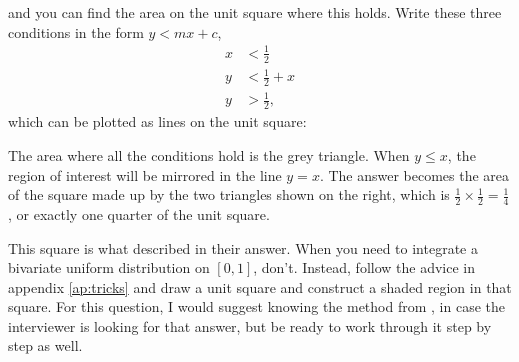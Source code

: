 \documentclass[a4paper]{article}
\begin{document}
and you can find the area on the unit square where this holds.
Write these three conditions in the form $y < mx + c$,
\begin{align}
x  &< \frac{1}{2}     \label{eq:stickbreaking:line1}  \\
y  &< \frac{1}{2} + x \label{eq:stickbreaking:line2}  \\
y  &> \frac{1}{2}     \label{eq:stickbreaking:line3}
\text{,}
\end{align}
which can be plotted as lines on the unit square:
\begin{center}
\end{center}
The area where all the conditions hold is the grey triangle.
When $y \leq x$, the region of interest will be mirrored in the line $y=x$.
The answer becomes the area of the square made up by the two triangles shown on the right, which is
$\frac{1}{2} \times \frac{1}{2} = \frac{1}{4}$, or exactly one quarter of the unit square.

This square is what \citet{JoshiQA} described in their answer.
When you need to integrate a bivariate uniform distribution on $[0,1]$, don't.
Instead, follow the advice in appendix \ref{ap:tricks} and draw a unit square and construct a shaded region in that square.
For this question, I would suggest knowing the method from \citet{JoshiQA}, in case the interviewer is looking for that answer, but be ready to work through it step by step as well.
\end{document}

